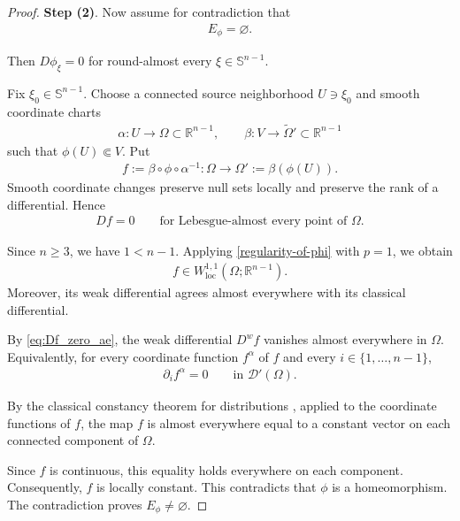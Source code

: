 \documentclass[11pt]{amsart}
\theoremstyle{plain}
\theoremstyle{plain}
\theoremstyle{plain}
\newcommand{\R}{\mathbb R}
\numberwithin{equation}{section}
\begin{document}
\begin{proof}
\textbf{Step (2)}.  Now assume for contradiction that
\begin{align}
E_\phi=\varnothing.\nonumber
\end{align}

Then $D\phi_\xi=0$ for round-almost every $\xi\in \mathbb{S}^{n-1}$.

Fix \(\xi_0\in \mathbb{S}^{n-1}\).  Choose a connected source neighborhood
\(U\ni\xi_0\) and smooth coordinate charts
\begin{align}
\alpha:U\longrightarrow\Omega\subset\R^{n-1},
\qquad
\beta:V\longrightarrow\widetilde\Omega'\subset\R^{n-1}\nonumber
\end{align}
such that \(\phi(U)\Subset V\).  Put
\begin{align}
f:=\beta\circ\phi\circ\alpha^{-1}:
\Omega\longrightarrow\Omega':=\beta(\phi(U)).\nonumber
\end{align}
Smooth coordinate changes preserve null sets locally and preserve the
rank of a differential.  Hence 
\begin{align}
Df=0
\qquad\text{for Lebesgue-almost every point of }\Omega.
\label{eq:Df_zero_ae}
\end{align}

Since \(n\geq3\), we have \(1<n-1\).  Applying
\eqref{regularity-of-phi} with \(p=1\), we obtain
\begin{align}
f\in W^{1,1}_{\mathrm{loc}}(\Omega;\R^{n-1}).
\nonumber
\end{align}
Moreover, its weak differential agrees almost everywhere with its
classical differential.


By \eqref{eq:Df_zero_ae}, the weak
differential \(D^{w}f\) vanishes almost everywhere in \(\Omega\).
Equivalently, for every coordinate function \(f^\alpha\) of
\(f\) and every \(i\in\{1,\ldots,n-1\}\),
\begin{align}
\partial_i f^\alpha=0
\qquad\text{in }\mathcal D'(\Omega).
\nonumber
\end{align}

By the classical constancy theorem for distributions
\cite[Theorem~6.11]{LiebLoss}, applied to the coordinate functions of \(f\),
the map \(f\) is almost everywhere equal to a constant vector on each
connected component of \(\Omega\). 

Since \(f\) is continuous, this equality holds everywhere on each component. Consequently, \(f\) is
locally constant.  This contradicts that \(\phi\) is a homeomorphism.
The contradiction proves \(E_\phi\neq\varnothing\).
\end{proof}
\end{document}
